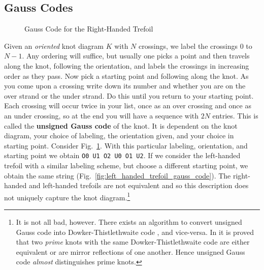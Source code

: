     \subsection{Gauss Codes}
        \begin{figure}
            \centering
            \caption{Gauss Code for the Right-Handed Trefoil}
            \label{fig:right_handed_trefoil_gauss_code}
        \end{figure}
        Given an \textit{oriented} knot diagram $K$ with $N$ crossings, we
        label the crossings $0$ to $N-1$. Any ordering will suffice, but
        usually one picks a point and then travels along the knot, following
        the orientation, and labels the crossings in increasing order as they
        pass. Now pick a starting point and following along the knot. As you
        come upon a crossing write down its number and whether you are on the
        over strand or the under strand. Do this until you return to your
        starting point. Each crossing will occur twice in your list, once as an
        over crossing and once as an under crossing, so at the end you will
        have a sequence with $2N$ entries. This is called the
        \textbf{unsigned Gauss code} of the knot. It is dependent on the
        knot diagram, your choice of labeling, the orientation given, and your
        choice in starting point. Consider
        Fig.~\ref{fig:right_handed_trefoil_gauss_code}. With this particular
        labeling, orientation, and starting point we obtain
        \texttt{O0 U1 O2 U0 O1 U2}. If we consider the left-handed trefoil with
        a similar labeling scheme, but choose a different starting point, we
        obtain the same string (Fig.~\ref{fig:left_handed_trefoil_gauss_code}).
        The right-handed and left-handed trefoils are
        not equivalent \cite[p.~200-204]{DehnGroupTheoryAndTopology} and so
        this description does not uniquely capture the knot diagram.\footnote{%
            It is not all bad, however. There exists an algorithm to
            convert unsigned Gauss code into Dowker-Thistlethwaite code
            \cite{KatlasDTCode}, and vice-versa. In \cite{DOWKER198319} it is
            proved that two \textit{prime} knots with the same
            Dowker-Thistlethwaite code are either equivalent or are mirror
            reflections of one another. Hence unsigned Gauss code
            \textit{almost} distinguishes prime knots.
        }
